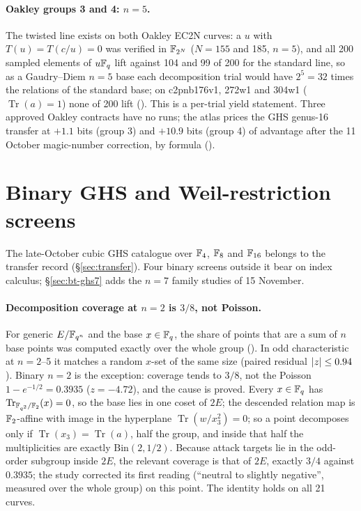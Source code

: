 \paragraph{Oakley groups 3 and 4: $n=5$.} The twisted line exists on both
Oakley EC2N curves: a $u$ with $T(u)=T(c/u)=0$ was verified in $\mathbb{F}_{2^N}$
($N=155$ and 185, $n=5$), and all 200 sampled elements of $u\mathbb{F}_q$ lift
against 104 and 99 of 200 for the standard line, so as a Gaudry--Diem $n=5$
base each decomposition trial would have $2^5=32$ times the relations of the
standard base; on c2pnb176v1, 272w1 and 304w1 ($\operatorname{Tr}(a)=1$)
none of 200 lift (). This
is a per-trial yield statement. Three approved Oakley contracts have no
runs; the atlas prices the GHS genus-16 transfer at $+1.1$ bits (group 3) and
$+10.9$ bits (group 4) of advantage after the 11 October magic-number
correction, by formula
().

\section{Binary GHS and Weil-restriction screens}\label{sec:bt-ghs}

The late-October cubic GHS catalogue over $\mathbb{F}_4$, $\mathbb{F}_8$ and $\mathbb{F}_{16}$
belongs to the transfer record (\S\ref{sec:transfer}). Four binary screens
outside it bear on index calculus;
\S\ref{sec:bt-ghs7} adds the $n=7$ family studies of 15 November.

\paragraph{Decomposition coverage at $n=2$ is $3/8$, not Poisson.} For
generic $E/\mathbb{F}_{q^n}$ and the base $x\in\mathbb{F}_q$, the share of points that are
a sum of $n$ base points was computed exactly over the whole group
(). In odd
characteristic at $n=2$--5 it matches a random $x$-set of the same size
(paired residual $\lvert z \rvert\le0.94$). Binary $n=2$ is the exception: coverage
tends to $3/8$, not the Poisson $1-e^{-1/2}=0.3935$ ($z=-4.72$), and the cause
is proved. Every $x\in\mathbb{F}_q$ has $\operatorname{Tr}_{\mathbb{F}_{q^2}/\mathbb{F}_2}(x)=0$,
so the base lies in one coset of $2E$; the descended relation map is
$\mathbb{F}_2$-affine with image in the hyperplane $\operatorname{Tr}(w/x_3^2)=0$; so
a point decomposes only if $\operatorname{Tr}(x_3)=\operatorname{Tr}(a)$, half
the group, and inside that half the multiplicities are exactly
$\mathrm{Bin}(2,1/2)$. Because attack targets lie in the odd-order subgroup
inside $2E$, the relevant coverage is that of $2E$, exactly $3/4$ against
$0.3935$; the study corrected its first reading (``neutral to slightly
negative'', measured over the whole group) on this point. The identity holds
on all 21 curves.

